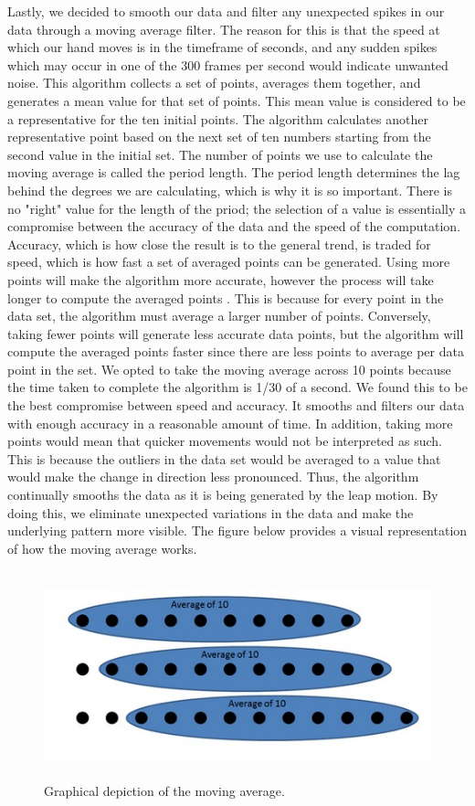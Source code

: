 \documentclass[letterpaper,english, 12pt]{article}
\begin{document}
Lastly, we decided to smooth our data and filter any unexpected spikes in our data through a moving average filter.  The reason for this is that the speed at which our hand moves is in the timeframe of seconds, and any sudden spikes which may occur in one of the 300 frames per second would indicate unwanted noise. This algorithm collects a set of points, averages them together, and generates a mean value for that set of points. This mean value is considered to be a representative for the ten initial points. The algorithm calculates another representative point based on the next set of ten numbers starting from the second value in the initial set. The number of points we use to calculate the moving average is called the period length. The period length determines the lag behind the degrees we are calculating, which is why it is so important. There is no "right" value for the length of the priod; the selection of a value is essentially a compromise between the accuracy of the data and the speed of the computation. Accuracy, which is how close the result is to the general trend, is traded for speed, which is how fast a set of averaged points can be generated. Using more points will make the algorithm more accurate, however the process will take longer to compute the averaged points \cite{cit13}. This is because for every point in the data set, the algorithm must average a larger number of points. Conversely, taking fewer points will generate less accurate data points, but the algorithm will compute the averaged points faster since there are less points to average per data point in the set. We opted to take the moving average across 10 points because the time taken to complete the algorithm is 1/30 of a second. We found this to be the best compromise between speed and accuracy. It smooths and filters our data with enough accuracy in a reasonable amount of time. In addition, taking more points would mean that quicker movements would not be interpreted as such. This is because the outliers in the data set would be averaged to a value that would make the change in direction less pronounced. Thus, the algorithm continually smooths the data as it is being generated by the leap motion. By doing this, we eliminate unexpected variations in the data and make the underlying pattern more visible. The figure below provides a visual representation of how the moving average works.  

\begin{figure}[t]
	\centering
	\includegraphics[height=6cm,width=120mm]{pics/movingAverage.jpg}
	\caption{Graphical depiction of the moving average.}
\end{figure}
\end{document}
